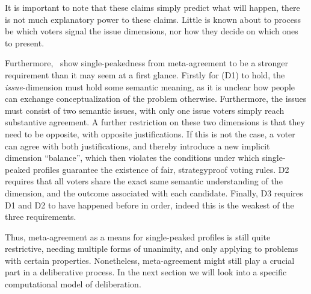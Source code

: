 It is important to note that these claims simply predict what will happen,
there is not much explanatory power to these claims. Little is known about to
process be which voters signal the issue dimensions, nor how they decide on
which ones to present.

Furthermore,~\citet{ottonelliElusiveNotionMetaagreement2013} show
single-peakedness from meta-agreement to be a stronger requirement than it may
seem at a first glance. Firstly for (D1) to hold, the \emph{issue}-dimension
must hold some semantic meaning, as it is unclear how people can exchange
conceptualization of the problem otherwise. Furthermore, the issues must
consist of two semantic issues, with only one issue voters simply reach substantive
agreement. A further restriction on these two dimensions is that they need to
be opposite, with opposite justifications. If this is not the case, a voter can
agree with both justifications, and thereby introduce a new implicit dimension
``balance'', which then violates the conditions under which single-peaked
profiles guarantee the existence of fair, strategyproof voting rules. D2
requires that all voters share the exact same semantic understanding of the
dimension, and the outcome associated with each candidate. Finally, D3 requires
D1 and D2 to have happened before in order, indeed this is the weakest of the
three requirements.

Thus, meta-agreement as a means for single-peaked profiles is still quite
restrictive, needing multiple forms of unanimity, and only applying to problems
with certain properties. Nonetheless,  meta-agreement might still
play a crucial part in a deliberative process. In the next section we will
look into a specific computational model of deliberation.



